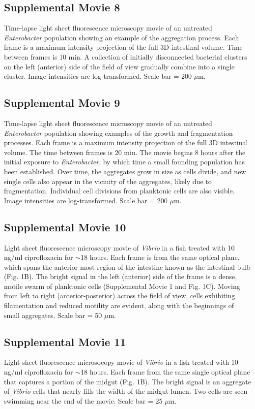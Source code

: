 \subsection*{Supplemental Movie 8}
Time-lapse light sheet fluorescence microscopy movie of an untreated \textit{Enterobacter} population showing an example of the aggregation process. Each frame is a maximum intensity projection of the full 3D intestinal volume. Time between frames is 10 min. A collection of initially disconnected bacterial clusters on the left (anterior) side of the field of view gradually combine into a single cluster. Image intensities are log-transformed. Scale bar = 200 $\mu$m.

\subsection*{Supplemental Movie 9}
Time-lapse light sheet fluorescence microscopy movie of an untreated \textit{Enterobacter} population showing examples of the growth and fragmentation processes. Each frame is a maximum intensity projection of the full 3D intestinal volume. The time between frames is 20 min. The movie begins 8 hours after the initial exposure to \textit{Enterobacter}, by which time a small founding population has been established. Over time, the aggregates grow in size as cells divide, and new single cells also appear in the vicinity of the aggregates, likely due to fragmentation. Individual cell divisions from planktonic cells are also visible. Image intensities are log-transformed. Scale bar = 200 $\mu$m.

\subsection*{Supplemental Movie 10}
Light sheet fluorescence microscopy movie of \textit{Vibrio} in a fish treated with 10 ng/ml ciprofloxacin for $\sim$18 hours. Each frame is from the same optical plane, which spans the anterior-most region of the intestine known as the intestinal bulb (Fig. 1B). The bright signal in the left (anterior) side of the frame is a dense, motile swarm of planktonic cells (Supplemental Movie 1 and Fig. 1C). Moving from left to right (anterior-posterior) across the field of view, cells exhibiting filamentation and reduced motility are evident, along with the beginnings of small aggregates. Scale bar = 50 $\mu$m.

\subsection*{Supplemental Movie 11}
Light sheet fluorescence microsocopy movie of \textit{Vibrio} in a fish treated with 10 ng/ml ciprofloxacin for $\sim$18 hours. Each frame from the same single optical plane that captures a portion of the midgut (Fig. 1B). The bright signal is an aggregate of \textit{Vibrio} cells that nearly fills the width of the midgut lumen. Two cells are seen swimming near the end of the movie. Scale bar = 25 $\mu$m.






